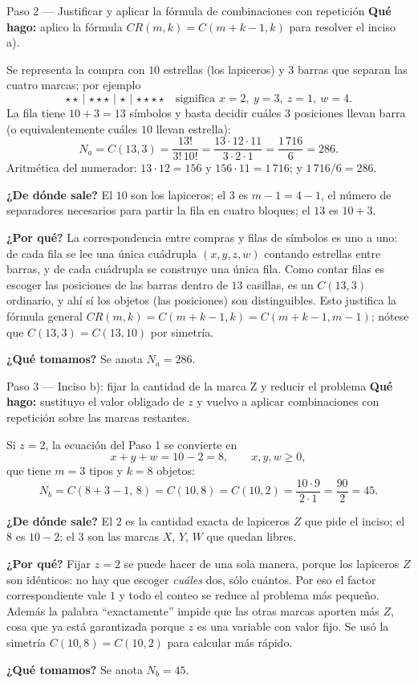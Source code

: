 \documentclass[11pt]{article}
\begin{document}
\begin{paso}{Paso 2 --- Justificar y aplicar la fórmula de combinaciones con repetición}
\textbf{Qué hago:} aplico la fórmula $CR(m,k)=C(m+k-1,k)$ para resolver el inciso a).

Se representa la compra con $10$ estrellas (los lapiceros) y $3$ barras que separan las cuatro marcas; por ejemplo
\[
  \star\star\,|\,\star\star\star\,|\,\star\,|\,\star\star\star\star \quad\text{significa } x=2,\ y=3,\ z=1,\ w=4 .
\]
La fila tiene $10+3=13$ símbolos y basta decidir cuáles $3$ posiciones llevan barra (o equivalentemente cuáles $10$ llevan estrella):
\[
  N_a = C(13,3)=\frac{13!}{3!\,10!}=\frac{13\cdot 12\cdot 11}{3\cdot 2\cdot 1}=\frac{1\,716}{6}=286 .
\]
Aritmética del numerador: $13\cdot 12=156$ y $156\cdot 11=1\,716$; y $1\,716/6=286$.

\textbf{¿De dónde sale?} El $10$ son los lapiceros; el $3$ es $m-1=4-1$, el número de separadores necesarios para partir la fila en cuatro bloques; el $13$ es $10+3$.

\textbf{¿Por qué?} La correspondencia entre compras y filas de símbolos es uno a uno: de cada fila se lee una única cuádrupla $(x,y,z,w)$ contando estrellas entre barras, y de cada cuádrupla se construye una única fila. Como contar filas es escoger las posiciones de las barras dentro de $13$ casillas, es un $C(13,3)$ ordinario, y ahí sí los objetos (las posiciones) son distinguibles. Esto justifica la fórmula general $CR(m,k)=C(m+k-1,k)=C(m+k-1,m-1)$; nótese que $C(13,3)=C(13,10)$ por simetría.

\textbf{¿Qué tomamos?} Se anota $N_a=286$.
\end{paso}

\begin{paso}{Paso 3 --- Inciso b): fijar la cantidad de la marca Z y reducir el problema}
\textbf{Qué hago:} sustituyo el valor obligado de $z$ y vuelvo a aplicar combinaciones con repetición sobre las marcas restantes.

Si $z=2$, la ecuación del Paso 1 se convierte en
\[
  x+y+w = 10-2 = 8,\qquad x,y,w\ge 0 ,
\]
que tiene $m=3$ tipos y $k=8$ objetos:
\[
  N_b = C(8+3-1,\,8)=C(10,8)=C(10,2)=\frac{10\cdot 9}{2\cdot 1}=\frac{90}{2}=45 .
\]

\textbf{¿De dónde sale?} El $2$ es la cantidad exacta de lapiceros $Z$ que pide el inciso; el $8$ es $10-2$; el $3$ son las marcas $X$, $Y$, $W$ que quedan libres.

\textbf{¿Por qué?} Fijar $z=2$ se puede hacer de una sola manera, porque los lapiceros $Z$ son idénticos: no hay que escoger \emph{cuáles} dos, sólo cuántos. Por eso el factor correspondiente vale $1$ y todo el conteo se reduce al problema más pequeño. Además la palabra ``exactamente'' impide que las otras marcas aporten más $Z$, cosa que ya está garantizada porque $z$ es una variable con valor fijo. Se usó la simetría $C(10,8)=C(10,2)$ para calcular más rápido.

\textbf{¿Qué tomamos?} Se anota $N_b=45$.
\end{paso}
\end{document}
